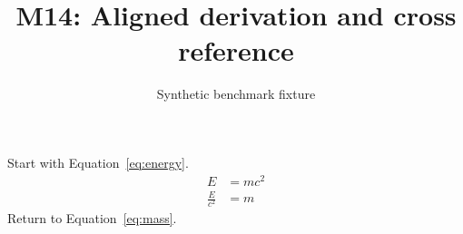 \documentclass{article}
\title{M14: Aligned derivation and cross reference}
\author{Synthetic benchmark fixture}
\date{}
\begin{document}
\maketitle
Start with Equation~\eqref{eq:energy}.
\begin{align}
E&=mc^2\label{eq:energy}\\
\frac{E}{c^2}&=m\label{eq:mass}
\end{align}
Return to Equation~\eqref{eq:mass}.
\end{document}
